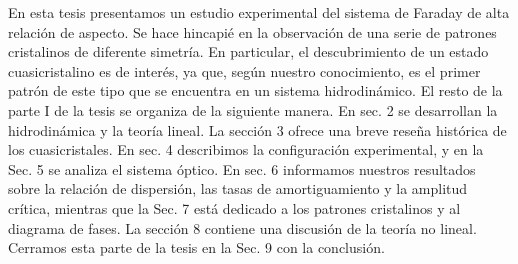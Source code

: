 En esta tesis presentamos un estudio experimental del sistema de Faraday de alta relación de aspecto. Se hace hincapié en la observación de una serie de patrones cristalinos de diferente simetría. En particular, el descubrimiento de un estado cuasicristalino es de interés, ya que, según nuestro conocimiento, es el primer patrón de este tipo que se encuentra en un sistema hidrodinámico. El resto de la parte I de la tesis se organiza de la siguiente manera. En sec. 2 se desarrollan la hidrodinámica y la teoría lineal. La sección 3 ofrece una breve reseña histórica de los cuasicristales. En sec. 4 describimos la configuración experimental, y en la Sec. 5 se analiza el sistema óptico. En sec. 6 informamos nuestros resultados sobre la relación de dispersión, las tasas de amortiguamiento y la amplitud crítica, mientras que la Sec. 7 está dedicado a los patrones cristalinos y al diagrama de fases. La sección 8 contiene una discusión de la teoría no lineal. Cerramos esta parte de la tesis en la Sec. 9 con la conclusión.
